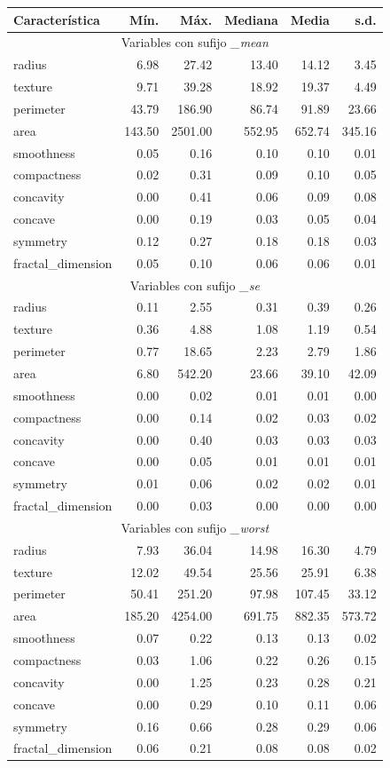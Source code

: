 \small
\begin{tabular*}{\textwidth}{@{\extracolsep{\fill}}lrrrrr}
\toprule
Característica & Mín. & Máx. & Mediana & Media & s.d. \\
\midrule
  \multicolumn{6}{c}{Variables con sufijo \textit{\_mean}} \\
\midrule
radius & 6.98 & 27.42 & 13.40 & 14.12 & 3.45\\
texture & 9.71 & 39.28 & 18.92 & 19.37 & 4.49\\
perimeter & 43.79 & 186.90 & 86.74 & 91.89 & 23.66\\
area & 143.50 & 2501.00 & 552.95 & 652.74 & 345.16\\
smoothness & 0.05 & 0.16 & 0.10 & 0.10 & 0.01\\
compactness & 0.02 & 0.31 & 0.09 & 0.10 & 0.05\\
concavity & 0.00 & 0.41 & 0.06 & 0.09 & 0.08\\
concave & 0.00 & 0.19 & 0.03 & 0.05 & 0.04\\
symmetry & 0.12 & 0.27 & 0.18 & 0.18 & 0.03\\
fractal\_dimension & 0.05 & 0.10 & 0.06 & 0.06 & 0.01\\
\midrule
  \multicolumn{6}{c}{Variables con sufijo \textit{\_se}} \\
\midrule
radius & 0.11 & 2.55 & 0.31 & 0.39 & 0.26\\
texture & 0.36 & 4.88 & 1.08 & 1.19 & 0.54\\
perimeter & 0.77 & 18.65 & 2.23 & 2.79 & 1.86\\
area & 6.80 & 542.20 & 23.66 & 39.10 & 42.09\\
smoothness & 0.00 & 0.02 & 0.01 & 0.01 & 0.00\\
compactness & 0.00 & 0.14 & 0.02 & 0.03 & 0.02\\
concavity & 0.00 & 0.40 & 0.03 & 0.03 & 0.03\\
concave & 0.00 & 0.05 & 0.01 & 0.01 & 0.01\\
symmetry & 0.01 & 0.06 & 0.02 & 0.02 & 0.01\\
fractal\_dimension & 0.00 & 0.03 & 0.00 & 0.00 & 0.00\\
\midrule
  \multicolumn{6}{c}{Variables con sufijo \textit{\_worst}} \\
\midrule
radius & 7.93 & 36.04 & 14.98 & 16.30 & 4.79\\
texture & 12.02 & 49.54 & 25.56 & 25.91 & 6.38\\
perimeter & 50.41 & 251.20 & 97.98 & 107.45 & 33.12\\
area & 185.20 & 4254.00 & 691.75 & 882.35 & 573.72\\
smoothness & 0.07 & 0.22 & 0.13 & 0.13 & 0.02\\
compactness & 0.03 & 1.06 & 0.22 & 0.26 & 0.15\\
concavity & 0.00 & 1.25 & 0.23 & 0.28 & 0.21\\
concave & 0.00 & 0.29 & 0.10 & 0.11 & 0.06\\
symmetry & 0.16 & 0.66 & 0.28 & 0.29 & 0.06\\
fractal\_dimension & 0.06 & 0.21 & 0.08 & 0.08 & 0.02\\
\bottomrule
\end{tabular*}
